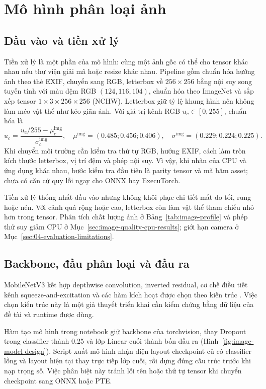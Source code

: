 \section{Mô hình phân loại ảnh}\label{sec:image-design}
\subsection{Đầu vào và tiền xử lý}
Tiền xử lý là một phần của mô hình: cùng một ảnh gốc có thể cho tensor khác nhau nếu thư viện giải mã hoặc resize khác nhau. Pipeline gồm chuẩn hóa hướng ảnh theo thẻ EXIF, chuyển sang RGB, letterbox về $256\times256$ bằng nội suy song tuyến tính với màu đệm RGB $(124,116,104)$, chuẩn hóa theo ImageNet và sắp xếp tensor $1\times3\times256\times256$ (NCHW). Letterbox giữ tỷ lệ khung hình nên không làm méo vật thể như kéo giãn ảnh. Với giá trị kênh RGB $u_c\in[0,255]$, chuẩn hóa là
\begin{equation}
\hat u_c=\frac{u_c/255-\mu_c^{\mathrm{img}}}{\sigma_c^{\mathrm{img}}},\quad
\mu^{\mathrm{img}}=(0.485;0.456;0.406),\quad
\sigma^{\mathrm{img}}=(0.229;0.224;0.225).
\end{equation}
Khi chuyển môi trường cần kiểm tra thứ tự RGB, hướng EXIF, cách làm tròn kích thước letterbox, vị trí đệm và phép nội suy. Vì vậy, khi nhãn của CPU và ứng dụng khác nhau, bước kiểm tra đầu tiên là parity tensor và mã băm asset; chưa có căn cứ quy lỗi ngay cho ONNX hay ExecuTorch.

Tiền xử lý thống nhất đầu vào nhưng không khôi phục chi tiết mất do tối, rung hoặc nén. Với cảnh quá rộng hoặc cao, letterbox còn làm vật thể tham chiếu nhỏ hơn trong tensor. Phân tích chất lượng ảnh ở Bảng~\ref{tab:image-profile} và phép thử suy giảm CPU ở Mục~\ref{sec:image-quality-cpu-results}; giới hạn camera ở Mục~\ref{sec:04-evaluation-limitations}.

\subsection{Backbone, đầu phân loại và đầu ra}
MobileNetV3 kết hợp depthwise convolution, inverted residual, cơ chế điều tiết kênh squeeze-and-excitation và các hàm kích hoạt được chọn theo kiến trúc \citep{howard2019mobilenetv3}. Việc chọn kiến trúc này là một giả thuyết triển khai cần kiểm chứng bằng dữ liệu của đề tài và runtime được dùng.

Hàm tạo mô hình trong notebook giữ backbone của torchvision, thay Dropout trong classifier thành 0.25 và lớp Linear cuối thành bốn đầu ra (Hình~\ref{fig:image-model-design}). Script xuất mô hình nhận diện layout checkpoint cũ có classifier lồng và layout hiện tại thay trực tiếp lớp cuối, rồi dựng đúng cấu trúc trước khi nạp trọng số. Việc phân biệt này tránh lỗi tên hoặc thứ tự tensor khi chuyển checkpoint sang ONNX hoặc PTE.

